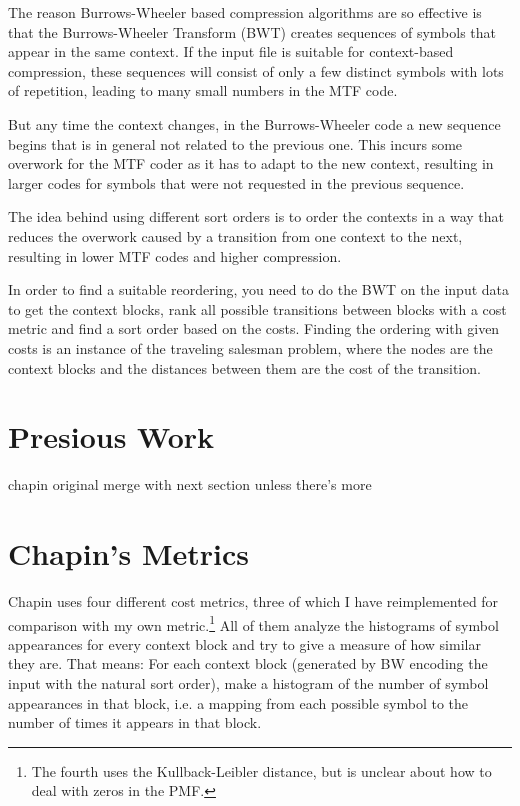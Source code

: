 \documentclass[a4paper]{scrreprt}
\begin{document}
The reason Burrows-Wheeler based compression algorithms are so effective is that
the Burrows-Wheeler Transform (BWT) creates sequences of symbols that appear in
the same context. If the input file is suitable for context-based
compression, these sequences will consist of only a few distinct symbols with
lots of repetition, leading to many small numbers in the MTF code.


But any time the context changes, in the Burrows-Wheeler code a new sequence
begins that is in general not related to the previous one. This incurs some
overwork\cite{bitner1979heuristics} for the MTF coder as it has to adapt to the
new context, resulting in larger codes for symbols that were not requested in
the previous sequence.


The idea behind using different sort orders is to order the contexts in a way
that reduces the overwork caused by a transition from one context to the next,
resulting in lower MTF codes and higher compression.

In order to find a suitable reordering, you need to do the BWT on the input data
to get the context blocks, rank all possible transitions between blocks with a
cost metric and find a sort order based on the costs. Finding the ordering with
given costs is an instance of the traveling salesman problem, where the nodes
are the context blocks and the distances between them are the cost of the
transition.

\section{Presious Work}

chapin original \cite{chapin1998sort,chapin2001diss}
merge with next section unless there's more

\section{Chapin's Metrics}


Chapin uses four different cost metrics, three of which I have reimplemented for
comparison with my own metric.\footnote{The fourth uses the Kullback-Leibler
distance, but is unclear about how to deal with zeros in the PMF.} All of them
analyze the histograms of symbol appearances for every context block and try to
give a measure of how similar they are. That means: For each context block
(generated by BW encoding the input with the natural sort order), make a
histogram of the number of symbol appearances in that block, i.e.
a mapping from each possible symbol to the number of times it appears in that
block.
\end{document}

